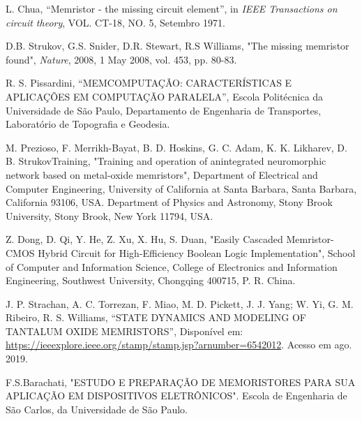\documentclass{ceel}
\begin{document}
\begin{multicols}{2}
\begin{thebibliography}{9}
    L. Chua,
    “Memristor - the missing circuit element”, 
    in \emph{IEEE Transactions on circuit theory}, VOL. CT-18, NO. 5, Setembro 1971.

     D.B. Strukov, G.S. Snider, D.R. Stewart,  R.S Williams, 
"The missing memristor found", 
\emph{Nature}, 2008, 1 May 2008, vol. 453, pp. 80-83.

    R. S. Pissardini,
    “MEMCOMPUTAÇÃO: CARACTERÍSTICAS E APLICAÇÕES EM
COMPUTAÇÃO PARALELA”, Escola Politécnica da Universidade de São Paulo, Departamento de Engenharia de Transportes, Laboratório de Topografia e Geodesia.
 
   M. Prezioso, F. Merrikh-Bayat, B. D. Hoskins, G. C. Adam, K. K. Likharev, D. B. StrukovTraining, "Training and operation of anintegrated neuromorphic
network based on metal-oxide memristors", 
Department of Electrical and Computer Engineering, University of California at Santa Barbara, Santa Barbara, California 93106, USA. 
Department of Physics and Astronomy, Stony Brook University,
Stony Brook, New York 11794, USA. 

    Z. Dong, D. Qi, Y. He, Z. Xu, X. Hu, S. Duan, "Easily Cascaded Memristor-CMOS Hybrid Circuit
for High-Efficiency Boolean Logic Implementation", School of Computer and Information Science,
College of Electronics and Information Engineering,
Southwest University, Chongqing 400715, P. R. China.

    J. P. Strachan, A. C. Torrezan, F. Miao, M. D. Pickett, J. J. Yang; W. Yi, G. M. Ribeiro, R. S. Williams, “STATE DYNAMICS AND MODELING OF TANTALUM OXIDE MEMRISTORS”, Disponível em: \url{https://ieeexplore.ieee.org/stamp/stamp.jsp?arnumber=6542012}. Acesso em ago. 2019.
 
   F.S.Barachati, "ESTUDO E PREPARAÇÃO DE MEMORISTORES PARA SUA APLICAÇÃO EM DISPOSITIVOS ELETRÔNICOS". Escola de Engenharia de São Carlos, da Universidade de São Paulo. 


\end{thebibliography}
\end{multicols}
\end{document}

